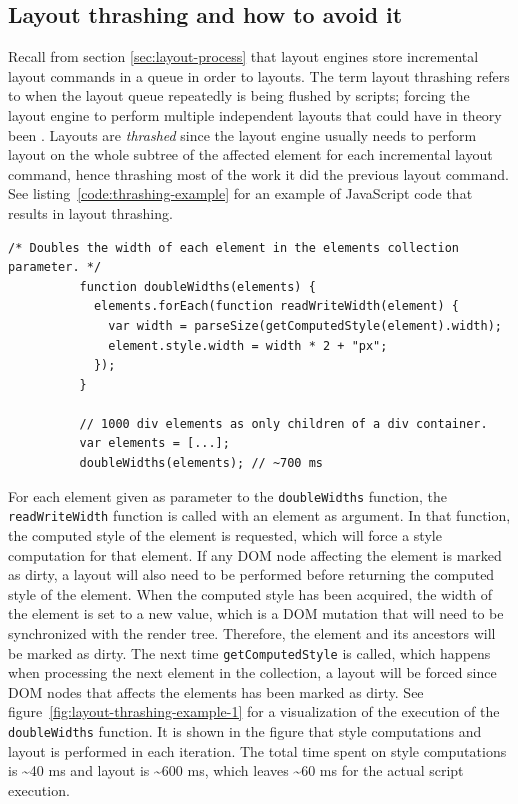 \documentclass[a4paper,11pt]{kth-mag}
\newcommand{\code}[1]{\texttt{#1}}
\begin{document}
      \subsection{Layout thrashing and how to avoid it}\label{sec:layout-thrashing}
        Recall from section \ref{sec:layout-process} that \glspl{layout engine} store incremental layout commands in a queue in order to  layouts.
        The term \gls{layout thrashing} refers to when the layout queue repeatedly is being flushed by scripts; forcing the \gls{layout engine} to perform multiple independent layouts that could have in theory been .
        Layouts are \emph{thrashed} since the layout engine usually needs to perform layout on the whole subtree of the affected element for each incremental layout command, hence thrashing most of the work it did the previous layout command.
        See listing~\ref{code:thrashing-example} for an example of \gls{JavaScript} code that results in layout thrashing.
        \begin{lstlisting}[gobble=10,caption={Example of layout thrashing. The code reads and double the widths of 1000 \glspl{element} in \textasciitilde700 ms. The \code{parseSize} function is not important to understand the example.}, captionpos=b, label={code:thrashing-example}]
          /* Doubles the width of each element in the elements collection parameter. */
          function doubleWidths(elements) {
            elements.forEach(function readWriteWidth(element) {
              var width = parseSize(getComputedStyle(element).width);
              element.style.width = width * 2 + "px";
            });
          }

          // 1000 div elements as only children of a div container.
          var elements = [...];
          doubleWidths(elements); // ~700 ms
        \end{lstlisting}
        For each element given as parameter to the \code{doubleWidths} function, the \code{readWriteWidth} function is called with an element as argument.
        In that function, the computed style of the element is requested, which will force a style computation for that element.
        If any \gls{DOM} node affecting the element is marked as dirty, a layout will also need to be performed before returning the computed style of the element.
        When the computed style has been acquired, the width of the element is set to a new value, which is a \gls{DOM} mutation that will need to be synchronized with the render tree.
        Therefore, the element and its ancestors will be marked as dirty.
        The next time \code{getComputedStyle} is called, which happens when processing the next element in the collection, a layout will be forced since \gls{DOM} nodes that affects the elements has been marked as dirty.
        See figure~\ref{fig:layout-thrashing-example-1} for a visualization of the execution of the \code{doubleWidths} function.
        It is shown in the figure that style computations and layout is performed in each iteration.
        The total time spent on style computations is \textasciitilde40 ms and layout is \textasciitilde600 ms, which leaves \textasciitilde60 ms for the actual script execution.
\end{document}
